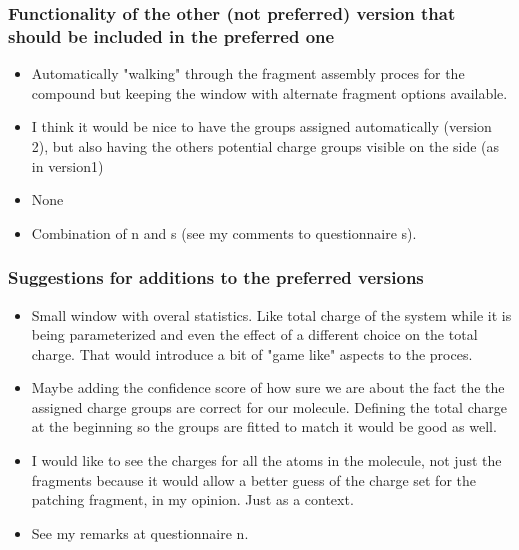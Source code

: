 \subsubsection{Functionality of the other (not preferred) version that should be included in the preferred one}
\begin{itemize}
\item Automatically "walking" through the fragment assembly proces for the compound but keeping the window with alternate fragment options available. 

\item I think it would be nice to have the groups assigned automatically (version 2), but also having the others potential charge groups visible on the side (as in version1)

\item None

\item Combination of n and s (see my comments to questionnaire s).

\end{itemize}


\subsubsection{Suggestions for additions to the preferred versions}
\begin{itemize}
\item Small window with overal statistics. Like total charge of the system while it is being parameterized and even the effect of a different choice on the total charge. That would introduce a bit of "game like" aspects to the proces. 

\item Maybe adding the confidence score of how sure we are about the fact the the assigned charge groups are correct for our molecule. Defining the total charge at the beginning so the groups are fitted to match it would be good as well.

\item I would like to see the charges for all the atoms in the molecule, not just the fragments because it would allow a better guess of the charge set for the patching fragment, in my opinion. Just as a context. 

\item See my remarks at questionnaire n.

\end{itemize}


